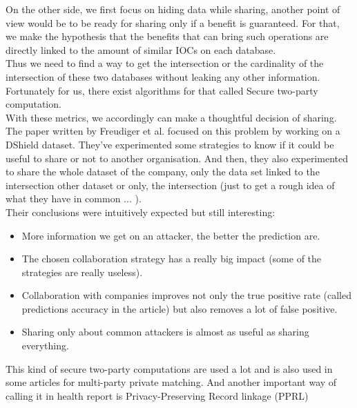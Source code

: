 \documentclass{eplmastersthesis}
\begin{document}
On the other side, we first focus on hiding data while sharing, another point of view would be to be ready for sharing only if a benefit is guaranteed. For that, we make the hypothesis that the benefits that can bring such operations are directly linked to the amount of similar IOCs on each database.\\
Thus we need to find a way to get the intersection or the cardinality of the intersection of these two databases without leaking any other information. Fortunately for us, there exist algorithms for that called Secure two-party computation.\\
With these metrics, we accordingly can make a thoughtful decision of sharing.\\
The paper written by Freudiger et al.\cite{freudiger2015controlled} focused on this problem by working on a DShield dataset. They've experimented some strategies to know if it could be useful to share or not to another organisation. And then, they also experimented to share the whole dataset of the company, only the data set linked to the intersection other dataset or only, the intersection (just to get a rough idea of what they have in common ... ).\\
Their conclusions were intuitively expected but still interesting:
\begin{itemize}
\item More information we get on an attacker, the better the prediction are.
\item The chosen collaboration strategy has a really big impact (some of the strategies are really useless).
\item Collaboration with companies improves not only the true positive rate (called predictions accuracy in the article) but also removes a lot of false positive.
\item Sharing only about common attackers is almost as useful as sharing everything.
\end{itemize}

This kind of secure two-party computations are used a lot and is also used in some articles for multi-party private matching. And another important way of calling it in health report is Privacy-Preserving Record linkage (PPRL)
\end{document}
